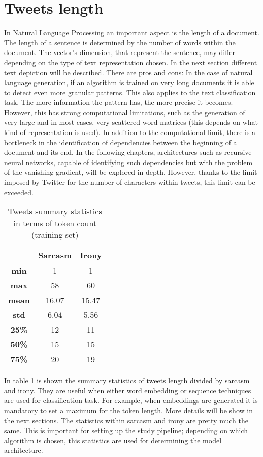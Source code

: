 \section{Tweets length}
In Natural Language Processing an important aspect is the length of a document. The length of a sentence is determined by the number of words within the document. The vector's dimension, that represent the sentence, may differ depending on the type of text representation chosen. In the next section different text depiction will be described. 
There are pros and cons: In the case of natural language generation, if an algorithm is trained on very long documents it is able to detect even more granular patterns. This also applies to the text classification task. The more information the pattern has, the more precise it becomes. However, this has strong computational limitations, such as the generation of very large and in most cases, very scattered word matrices (this depends on what kind of representation is used). In addition to the computational limit, there is a bottleneck in the identification of dependencies between the beginning of a document and its end. In the following chapters, architectures such as recursive neural networks, capable of identifying such dependencies but with the problem of the vanishing gradient, will be explored in depth. 
However, thanks to the limit imposed by Twitter for the number of characters within tweets, this limit can be exceeded. 
\begin{table}[h]
	\centering
	\begin{tabular}{|c|c|c|}
		\hline
		& \textbf{Sarcasm} & \textbf{Irony} \\ \hline
		\textbf{min}  & 1                & 1              \\ \hline
		\textbf{max}  & 58               & 60             \\ \hline
		\textbf{mean} & 16.07            & 15.47          \\ \hline
		\textbf{std}  & 6.04             & 5.56           \\ \hline
		\textbf{25\%} & 12               & 11             \\ \hline
		\textbf{50\%} & 15               & 15             \\ \hline
		\textbf{75\%} & 20               & 19             \\ \hline
	\end{tabular}
	\caption{Tweets summary statistics in terms of token count (training set)}
	\label{tab:tweetstats}
\end{table}
In table \ref{tab:tweetstats} is shown the summary statistics of tweets length divided by sarcasm and irony. They are useful when either word embedding or sequence techniques are used for classification task. For example, when embeddings are generated it is mandatory to set a maximum for the token length. More details will be show in the next sections. The statistics within sarcasm and irony are pretty much the same. This is important for setting up the study pipeline; depending on which algorithm is chosen, this statistics are used for determining the model architecture.  

